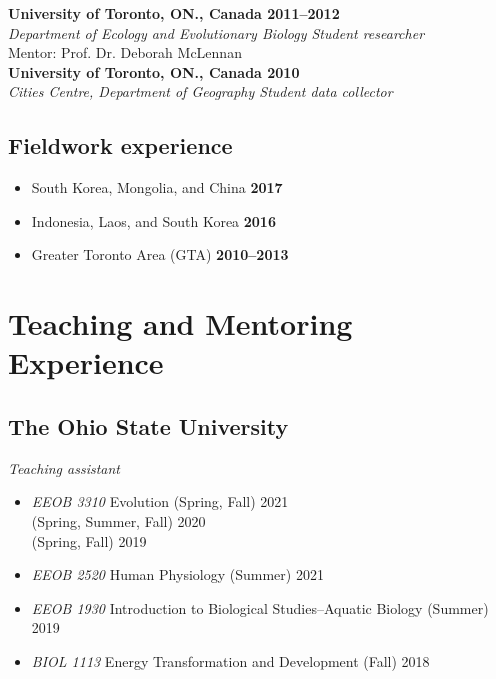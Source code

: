 \documentclass[11pt,letterpaper,sans]{moderncv} %
\begin{document}
\textbf{University of Toronto, ON., Canada \hfill{2011--2012}}\\
\textit{Department of Ecology and Evolutionary Biology \hfill Student researcher}\\
Mentor: Prof. Dr. Deborah McLennan\\

\textbf{University of Toronto, ON., Canada \hfill{2010}}\\
\textit{Cities Centre, Department of Geography \hfill Student data collector}\\

\subsection{Fieldwork experience}
\begin{itemize}		
	\item South Korea, Mongolia, and China \hfill{\textbf{2017}}
	\item Indonesia, Laos, and South Korea \hfill{\textbf{2016}}
	\item Greater Toronto Area (GTA) \hfill{\textbf{2010--2013}}
\end{itemize}		

\pagebreak
\section{Teaching and Mentoring Experience}
\subsection{The Ohio State University}
	\textit{Teaching assistant}
\begin{itemize} 
	\item \textit{EEOB 3310} Evolution \hfill (Spring, Fall) 2021\\ 
				\indent\hfill (Spring, Summer, Fall) 2020\\ 
				\indent\hfill (Spring, Fall) 2019
	\item \textit{EEOB 2520} Human Physiology \hfill (Summer) 2021
	\item \textit{EEOB 1930} Introduction to Biological Studies--Aquatic Biology \hfill (Summer) 2019
	\item \textit{BIOL 1113} Energy Transformation and Development \hfill (Fall) 2018
\end{itemize} 
\end{document}
